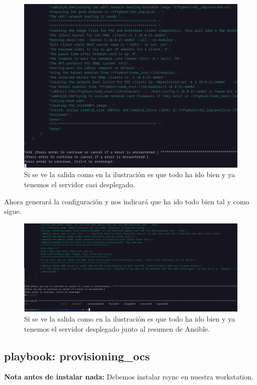\begin{figure}[H]
	\centering
	\includegraphics[scale=0.30]{deploy-drbl/deploy04}
	\caption{Si se ve la salida como en la ilustración es que todo ha ido bien y ya tenemos el servidor casi desplegado.}
\end{figure}

Ahora generará la configuración y nos indicará que ha ido todo bien tal y como sigue.

\begin{figure}[H]
	\centering
	\includegraphics[scale=0.30]{deploy-drbl/deploy05}
	\caption{Si se ve la salida como en la ilustración es que todo ha ido bien y ya tenemos el servidor desplegado junto al resumen de Ansible.}
\end{figure}

\newpage
\subsection{playbook: provisioning\_ocs}

\textbf{Nota antes de instalar nada:} Debemos instalar rsync en nuestra workstation.

